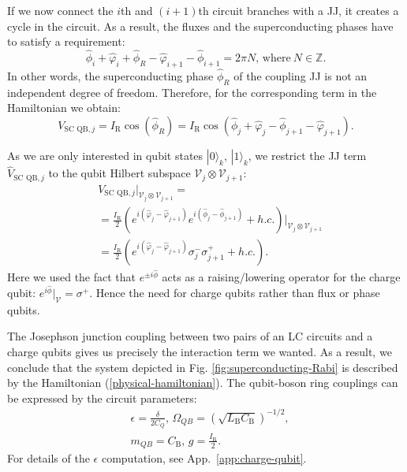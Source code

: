 \documentclass[reprint, aps, prx, amsmath, amssymb, longbibliography, superscriptaddress]{revtex4-2}
\begin{document}
If we now connect the $i$th and $(i+1)$th circuit branches with a JJ, it creates a cycle in the circuit. As a result, the fluxes and the superconducting phases have to satisfy a requirement:
\begin{equation}
  \hat \phi_i + \hat\varphi_i + \hat\phi_R - \hat\varphi_{i+1} - \hat\phi_{i+1} = 2\pi N, \, \text{where}\ N \in \mathbb{Z}.
\end{equation}
In other words, the superconducting phase $\hat \phi_R$ of the coupling JJ is not an independent degree of freedom. Therefore, for the corresponding term in the Hamiltonian we obtain:
\begin{equation}
    V_{\text{SC QB},j} = I_{\text{R}} \cos(\hat \phi_R) =  I_{\text{R}}\cos(\hat \phi_j + \hat \varphi_j - \hat \phi_{j+1} - \hat \varphi_{j+1}).
\end{equation}


As we are only interested in qubit states $|0\rangle_k,\, |1\rangle_k$, we restrict the JJ term $\hat V_{\text{SC QB},j}$ to the qubit Hilbert subspace $\mathcal{V}_j\otimes \mathcal{V}_{j+1}$:
\begin{equation}
\begin{aligned}
    &V_{\text{SC QB},j} \bigg |_{\mathcal{V}_j\otimes \mathcal{V}_{j+1}} = \\
    &=\frac{I_{\text{R}}}{2}\left(e^{i(\hat\varphi_j - \hat\varphi_{j+1})} e^{i(\hat\phi_j - \hat\phi_{j+1})} + h.c. \right) \bigg|_{\mathcal{V}_j\otimes \mathcal{V}_{j+1}} \\
    &=\frac{I_{\text{R}}}{2}\left(e^{i(\hat\varphi_j - \hat\varphi_{j+1})} \sigma_j^- \sigma_{j+1}^+ + h.c. \right).
\end{aligned}
\end{equation}
Here we used the fact that $e^{\pm i\hat\phi}$ acts as a raising/lowering operator for the charge qubit: $e^{i\hat\phi}|_{\mathcal{V}} = \sigma^+$. Hence the need for charge qubits rather than flux or phase qubits.

The Josephson junction coupling between two pairs of an LC circuits and a charge qubits gives us precisely the interaction term we wanted. As a result, we conclude that the system depicted in Fig. \ref{fig:superconducting-Rabi} is described by the Hamiltonian (\ref{physical-hamiltonian}).  The qubit-boson ring couplings can be expressed by the circuit parameters:
\begin{equation}
\begin{aligned}
    &\epsilon = \frac{\delta}{2 C_Q},\,
    \Omega_{QB} = \left(\sqrt{L_{\text{B}}C_{\text{B}}}\right)^{-1/2}, \\
    &m_{QB} = C_{\text{B}}, \, g = \frac{I_{\text{R}}}{2}.
\end{aligned}
\end{equation}
For details of the $\epsilon$ computation, see App.~\ref{app:charge-qubit}. 
\end{document}

